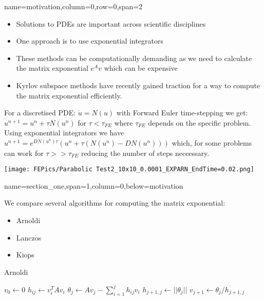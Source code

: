 \documentclass[latin,a0paper,portrait]{xebaposter}
\begin{document}
\begin{poster}
{name=motivation,column=0,row=0,span=2}
{
\begin{multicols}{2}
\begin{itemize}
\item Solutions to PDEs are important across scientific disciplines 
\item One approach is to use exponential integrators
\item These methods can be computationally demanding as we need to calculate the matrix exponential $e^Av$ which can be expensive
\item Kyrlov subspace methods have recently gained traction for a way to compute the matrix exponential efficiently\cite{Moler2003}.
\end{itemize}
For a discretised PDE: $\dot u = N(u)$ with Forward Euler time-stepping we get: $u^{n+1} = u^n+\tau N(u^n)$ for $\tau < \tau_{FE}$ where $\tau_{FE}$ depends on the specific problem. Using exponential integrators we have $u^{n+1} = e^{DN(u^n)\tau}(u^n + \tau(N(u^n)-DN(u^n)))$ which, for some problems can work for $\tau >> \tau_{FE}$ reducing the number of steps neccessary.
\columnbreak

\begin{center}
    \texttt{[image: FEPics/Parabolic Test2\_10x10\_0.0001\_EXPARN\_EndTime=0.02.png]}
    \label{fig:example_a}
\end{center}

\end{multicols}
}


{name=section_one,span=1,column=0,below=motivation}
{
We compare several algorithms for computing the matrix exponential:
\begin{itemize}
\item Arnoldi
\item Lanczos \cite{OJALVO1970}
\item Kiops \cite{Gaudreault2018}
\end{itemize}
\begin{center}
\begin{algorithm}[H]
\caption{Arnoldi \cite{Fan2018}} %
\begin{algorithmic}
\State $v_0 \gets 0$
\State$h_{ij} \gets v_i^T A v_i$
\EndFor
\State$\theta_j \gets Av_j - \sum^j_{i=1} h_{ij}v_i$
\State$h_{j+1,j} \gets ||\theta_j||$
\State$v_{j+1} \gets \theta_j/h_{j+1,j}$
\EndFor
\EndProcedure
\end{algorithmic}
\end{algorithm}
\end{center}
}


\end{poster}
\end{document}
